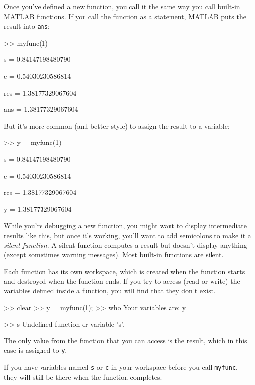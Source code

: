 \documentclass[../../book.tex]{subfiles}
\begin{document}

Once you've defined a new function, you call it the same way you
call built-in MATLAB functions.  If you call the function as a statement,
MATLAB puts the result into \lstinline{ans}:

\begin{code}
>> myfunc(1)

s = 0.84147098480790

c = 0.54030230586814

res = 1.38177329067604

ans = 1.38177329067604
\end{code}

But it's more common (and better style) to assign the result to
a variable:

\begin{code}
>> y = myfunc(1)

s = 0.84147098480790

c = 0.54030230586814

res = 1.38177329067604

y = 1.38177329067604
\end{code}

While you're debugging a new function, you might want to display
intermediate results like this, but once it's working, you'll want
to add semicolons to make it a \emph{silent function}.  A silent function
computes a result but doesn't display
anything (except sometimes warning messages). Most built-in
functions are silent.


Each function has its own workspace, which is created when the
function starts and destroyed when the function ends.  If you try to
access (read or write) the variables defined inside a function, you
will find that they don't exist.

\begin{code}
>> clear
>> y = myfunc(1);
>> who
Your variables are: y
\end{code}
\begin{code}
>> s
Undefined function or variable 's'.
\end{code}

The only value from the function that you can access is the result,
which in this case is assigned to \lstinline{y}.

If you have variables named \lstinline{s} or \lstinline{c} in your workspace
before you call \lstinline{myfunc}, they will still be there when the
function completes.
\end{document}
